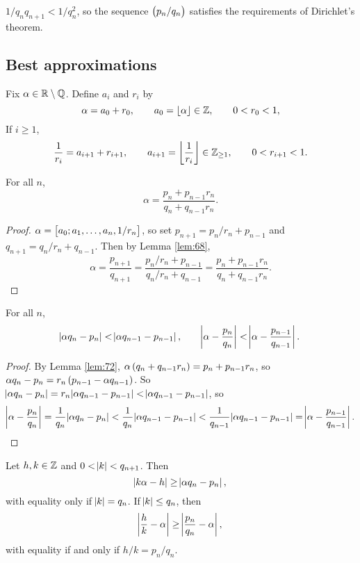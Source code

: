 \begin{note*}
$ 1 / q_nq_{n + 1} < 1 / q_n^2 $, so the sequence $ \br{p_n / q_n} $ satisfies the requirements of Dirichlet's theorem.
\end{note*}

\subsection{Best approximations}

Fix $ \alpha \in \mathbb{R} \setminus \mathbb{Q} $. Define $ a_i $ and $ r_i $ by
$$ \alpha = a_0 + r_0, \qquad a_0 = \left\lfloor \alpha \right\rfloor \in \mathbb{Z}, \qquad 0 < r_0 < 1, $$
If $ i \ge 1 $,
$$ \dfrac{1}{r_i} = a_{i + 1} + r_{i + 1}, \qquad a_{i + 1} = \left\lfloor \dfrac{1}{r_i} \right\rfloor \in \mathbb{Z}_{\ge 1}, \qquad 0 < r_{i + 1} < 1. $$

\begin{lemma}
\label{lem:72}
For all $ n $,
$$ \alpha = \dfrac{p_n + p_{n - 1}r_n}{q_n + q_{n - 1}r_n}. $$
\end{lemma}

\begin{proof}
$ \alpha = \sbr{a_0; a_1, \dots, a_n, 1 / r_n} $, so set $ p_{n + 1} = p_n / r_n + p_{n - 1} $ and $ q_{n + 1} = q_n / r_n + q_{n - 1} $. Then by Lemma \ref{lem:68},
$$ \alpha = \dfrac{p_{n + 1}}{q_{n + 1}} = \dfrac{p_n / r_n + p_{n - 1}}{q_n / r_n + q_{n - 1}} = \dfrac{p_n + p_{n - 1}r_n}{q_n + q_{n - 1}r_n}. $$
\end{proof}

\begin{corollary}
For all $ n $,
$$ \abs{\alpha q_n - p_n} < \abs{\alpha q_{n - 1} - p_{n - 1}}, \qquad \abs{\alpha - \dfrac{p_n}{q_n}} < \abs{\alpha - \dfrac{p_{n - 1}}{q_{n - 1}}}. $$
\end{corollary}

\begin{proof}
By Lemma \ref{lem:72}, $ \alpha\br{q_n + q_{n - 1}r_n} = p_n + p_{n - 1}r_n $, so $ \alpha q_n - p_n = r_n\br{p_{n - 1} - \alpha q_{n - 1}} $. So $ \abs{\alpha q_n - p_n} = r_n\abs{\alpha q_{n - 1} - p_{n - 1}} < \abs{\alpha q_{n - 1} - p_{n - 1}} $, so
$$ \abs{\alpha - \dfrac{p_n}{q_n}} = \dfrac{1}{q_n}\abs{\alpha q_n - p_n} < \dfrac{1}{q_n}\abs{\alpha q_{n - 1} - p_{n - 1}} < \dfrac{1}{q_{n - 1}}\abs{\alpha q_{n - 1} - p_{n - 1}} = \abs{\alpha - \dfrac{p_{n - 1}}{q_{n - 1}}}. $$
\end{proof}

\pagebreak

\begin{theorem}
\label{thm:74}
Let $ h, k \in \mathbb{Z} $ and $ 0 < \abs{k} < q_{n + 1} $. Then
$$ \abs{k\alpha - h} \ge \abs{\alpha q_n - p_n}, $$
with equality only if $ \abs{k} = q_n $. If $ \abs{k} \le q_n $, then
$$ \abs{\dfrac{h}{k} - \alpha} \ge \abs{\dfrac{p_n}{q_n} - \alpha}, $$
with equality if and only if $ h / k = p_n / q_n $.
\end{theorem}

